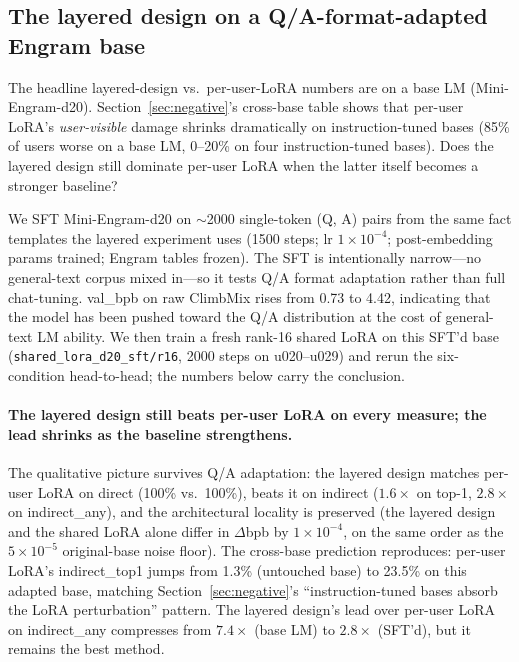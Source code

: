 \documentclass[letterpaper]{article} %
\begin{document}
\subsection{The layered design on a Q/A-format-adapted Engram base}
\label{sec:layered-sft}

The headline layered-design vs.\ per-user-LoRA numbers are on a base
LM (Mini-Engram-d20). Section~\ref{sec:negative}'s cross-base
table shows that per-user LoRA's \emph{user-visible} damage
shrinks dramatically on instruction-tuned bases (85\% of users
worse on a base LM, 0--20\% on four instruction-tuned bases).
Does the layered design still dominate per-user LoRA when the latter
itself becomes a stronger baseline?

We SFT Mini-Engram-d20 on $\sim$2000 single-token (Q, A) pairs
from the same fact templates the layered experiment uses (1500
steps; lr $1{\times}10^{-4}$; post-embedding params trained;
Engram tables frozen). The SFT is intentionally narrow---no
general-text corpus mixed in---so it tests Q/A format
adaptation rather than full chat-tuning. val\_bpb on raw
ClimbMix rises from 0.73 to 4.42, indicating that the model
has been pushed toward the Q/A distribution at the cost of
general-text LM ability. We then train a fresh rank-16 shared
LoRA on this SFT'd base
(\texttt{shared\_lora\_d20\_sft/r16}, 2000 steps on
u020--u029) and rerun the six-condition head-to-head; the
numbers below carry the conclusion.

\paragraph{The layered design still beats per-user LoRA on every
measure; the lead shrinks as the baseline
strengthens.} The qualitative picture survives Q/A adaptation:
the layered design matches per-user LoRA on direct (100\% vs.\ 100\%),
beats it on indirect
($1.6\times$ on top-1, $2.8\times$ on indirect\_any), and the
architectural locality is preserved (the layered design and the
shared LoRA alone differ in $\Delta$bpb by $1 \times 10^{-4}$, on
the same order as the $5 \times 10^{-5}$ original-base noise
floor). The cross-base prediction reproduces: per-user LoRA's
indirect\_top1 jumps from 1.3\% (untouched base) to 23.5\% on this
adapted base, matching Section~\ref{sec:negative}'s
``instruction-tuned bases absorb the LoRA perturbation''
pattern. The layered design's lead over per-user LoRA on
indirect\_any compresses from
$7.4\times$ (base LM) to $2.8\times$ (SFT'd), but it remains
the best method.
\end{document}
